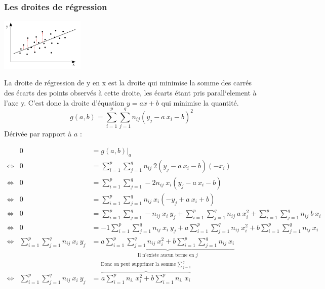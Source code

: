 \newpage
\subsubsection{Les droites de régression}

\begin{center}
	\includegraphics[width=0.3\textwidth]{images/droite_de_regression.pdf}
\end{center}
La droite de régression de y en x est la droite qui minimise la somme des carrés des écarts des points observés à cette droite, les écarts étant pris parall`element à l'axe y. C'est donc la droite d'équation $y = ax+b$ qui minimise la quantité.
$$\boxed{g(a,b) = \sum_{i=1}^{p} \sum_{j=1}^{q} n_{ij} (y_j - a\ x_i - b)^2}$$
Dérivée par rapport à $a$ :
\begin{center}
	$\begin{array}{CCL}
		                & 0 &= \left.g(a,b)\right|_a\\
		\Leftrightarrow & 0 &= \sum_{i=1}^{p} \sum_{j=1}^{q} n_{ij}\ 2(y_j - a\ x_i-b)(-x_i)\\
		\Leftrightarrow & 0 &= \sum_{i=1}^{p} \sum_{j=1}^{q} -2n_{ij}\ x_i(y_j - a\ x_i - b)\\
		\Leftrightarrow & 0 &= \sum_{i=1}^{p} \sum_{j=1}^{q} n_{ij}\ x_i(-y_j + a\ x_i + b)\\
		\Leftrightarrow & 0 &= \sum_{i=1}^{p} \sum_{j=1}^{q} -n_{ij}\ x_i\ y_j + \sum_{i=1}^{p} \sum_{j=1}^{q} n_{ij}\ a\ x_i^2 + \sum_{i=1}^{p} \sum_{j=1}^{q} n_{ij}\ b\ x_i\\
		\Leftrightarrow & 0 &= -1 \sum_{i=1}^{p} \sum_{j=1}^{q} n_{ij}\ x_i\ y_j + a \sum_{i=1}^{p} \sum_{j=1}^{q} n_{ij}\ x_i^2 + b \sum_{i=1}^{p} \sum_{j=1}^{q} n_{ij}\ x_i\\
		\Leftrightarrow &\sum_{i=1}^{p} \sum_{j=1}^{q} n_{ij}\ x_i\ y_j  &= \underbrace{a \sum_{i=1}^{p} \sum_{j=1}^{q} n_{ij}\ x_i^2 + b \sum_{i=1}^{p} \sum_{j=1}^{q} n_{ij}\ x_i}_\text{Il n'existe aucun terme en $j$}\\
		\Leftrightarrow &\sum_{i=1}^{p} \sum_{j=1}^{q} n_{ij}\ x_i\ y_j  &= \overbrace{a \sum_{i=1}^{p} n_{i.}\ x_i^2 + b \sum_{i=1}^{p} n_{i.}\ x_i}^\text{Donc on peut supprimer la somme $\sum_{j=1}^{q}$}
	\end{array}$
\end{center}
